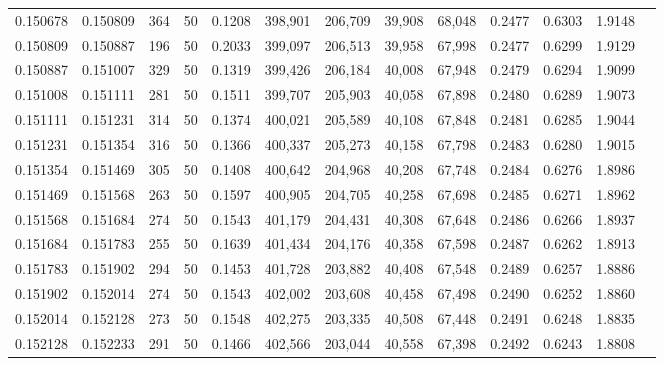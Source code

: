 \begin{tabular}{rrrrrrrrrrrrr}
0.150678 & 0.150809 &   364 &  50 &                                     0.1208 & 398,901 & 206,709 &  39,908 &  68,048 & 0.2477 & 0.6303 & 1.9148 \\
0.150809 & 0.150887 &   196 &  50 &                                     0.2033 & 399,097 & 206,513 &  39,958 &  67,998 & 0.2477 & 0.6299 & 1.9129 \\
0.150887 & 0.151007 &   329 &  50 &                                     0.1319 & 399,426 & 206,184 &  40,008 &  67,948 & 0.2479 & 0.6294 & 1.9099 \\
0.151008 & 0.151111 &   281 &  50 &                                     0.1511 & 399,707 & 205,903 &  40,058 &  67,898 & 0.2480 & 0.6289 & 1.9073 \\
0.151111 & 0.151231 &   314 &  50 &                                     0.1374 & 400,021 & 205,589 &  40,108 &  67,848 & 0.2481 & 0.6285 & 1.9044 \\
0.151231 & 0.151354 &   316 &  50 &                                     0.1366 & 400,337 & 205,273 &  40,158 &  67,798 & 0.2483 & 0.6280 & 1.9015 \\
0.151354 & 0.151469 &   305 &  50 &                                     0.1408 & 400,642 & 204,968 &  40,208 &  67,748 & 0.2484 & 0.6276 & 1.8986 \\
0.151469 & 0.151568 &   263 &  50 &                                     0.1597 & 400,905 & 204,705 &  40,258 &  67,698 & 0.2485 & 0.6271 & 1.8962 \\
0.151568 & 0.151684 &   274 &  50 &                                     0.1543 & 401,179 & 204,431 &  40,308 &  67,648 & 0.2486 & 0.6266 & 1.8937 \\
0.151684 & 0.151783 &   255 &  50 &                                     0.1639 & 401,434 & 204,176 &  40,358 &  67,598 & 0.2487 & 0.6262 & 1.8913 \\
0.151783 & 0.151902 &   294 &  50 &                                     0.1453 & 401,728 & 203,882 &  40,408 &  67,548 & 0.2489 & 0.6257 & 1.8886 \\
0.151902 & 0.152014 &   274 &  50 &                                     0.1543 & 402,002 & 203,608 &  40,458 &  67,498 & 0.2490 & 0.6252 & 1.8860 \\
0.152014 & 0.152128 &   273 &  50 &                                     0.1548 & 402,275 & 203,335 &  40,508 &  67,448 & 0.2491 & 0.6248 & 1.8835 \\
0.152128 & 0.152233 &   291 &  50 &                                     0.1466 & 402,566 & 203,044 &  40,558 &  67,398 & 0.2492 & 0.6243 & 1.8808 \\

\end{tabular}
